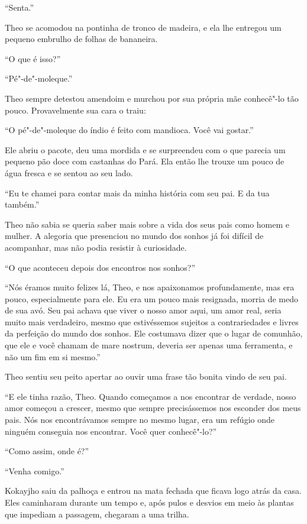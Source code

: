 ``Senta.''

Theo se acomodou na pontinha de tronco de madeira, e ela lhe entregou um
pequeno embrulho de folhas de bananeira.

``O que é isso?''

``Pé"-de"-moleque.''

Theo sempre detestou amendoim e murchou por sua própria mãe conhecê"-lo
tão pouco. Provavelmente sua cara o traiu:

``O pé"-de"-moleque do índio é feito com mandioca. Você vai gostar.''

Ele abriu o pacote, deu uma mordida e se surpreendeu com o que parecia
um pequeno pão doce com castanhas do Pará. Ela então lhe trouxe um pouco
de água fresca e se sentou ao seu lado.

``Eu te chamei para contar mais da minha história com seu pai. E da tua
também.''

Theo não sabia se queria saber mais sobre a vida dos seus pais como
homem e mulher. A alegoria que presenciou no mundo dos sonhos já foi
difícil de acompanhar, mas não podia resistir à curiosidade.

``O que aconteceu depois dos encontros nos sonhos?''

``Nós éramos muito felizes lá, Theo, e nos apaixonamos profundamente,
mas era pouco, especialmente para ele. Eu era um pouco mais resignada,
morria de medo de sua avó. Seu pai achava que viver o nosso amor aqui,
um amor real, seria muito mais verdadeiro, mesmo que estivéssemos
sujeitos a contrariedades e livres da perfeição do mundo dos sonhos. Ele
costumava dizer que o lugar de comunhão, que ele e você chamam de mare
nostrum, deveria ser apenas uma ferramenta, e não um fim em si mesmo.''

Theo sentiu seu peito apertar ao ouvir uma frase tão bonita vindo de seu
pai.

``E ele tinha razão, Theo. Quando começamos a nos encontrar de verdade,
nosso amor começou a crescer, mesmo que sempre precisássemos nos
esconder dos meus pais. Nós nos encontrávamos sempre no mesmo lugar, era
um refúgio onde ninguém conseguia nos encontrar. Você quer conhecê"-lo?''

``Como assim, onde é?''

``Venha comigo.''

Kokayjho saiu da palhoça e entrou na mata fechada que ficava logo atrás
da casa. Eles caminharam durante um tempo e, após pulos e desvios em
meio às plantas que impediam a passagem, chegaram a uma trilha.

